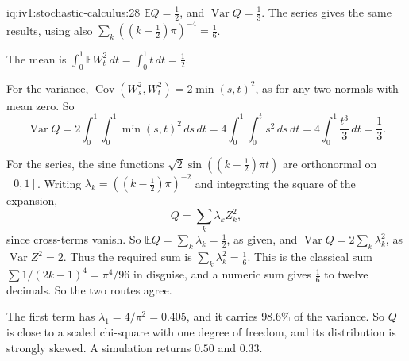 \begin{solution}{iq:iv1:stochastic-calculus:28}
$\mathbb{E}Q = \frac12$, and $\operatorname{Var}Q = \frac13$. The series gives the same results, using also $\sum_k((k - \frac12)\pi)^{-4} = \frac16$.

The mean is $\int_0^1\mathbb{E}W_t^2\,dt = \int_0^1t\,dt = \frac12$.

For the variance, $\operatorname{Cov}(W_s^2, W_t^2) = 2\min(s, t)^2$, as for any two normals with mean zero. So
\[
\operatorname{Var}Q = 2\int_0^1\int_0^1\min(s, t)^2\,ds\,dt = 4\int_0^1\int_0^ts^2\,ds\,dt = 4\int_0^1\frac{t^3}{3}\,dt = \frac13.
\]

For the series, the sine functions $\sqrt{2}\sin((k - \frac12)\pi t)$ are orthonormal on $[0, 1]$. Writing $\lambda_k = ((k - \frac12)\pi)^{-2}$ and integrating the square of the expansion,
\[
Q = \sum_k\lambda_kZ_k^2,
\]
since cross-terms vanish. So $\mathbb{E}Q = \sum_k\lambda_k = \frac12$, as given, and $\operatorname{Var}Q = 2\sum_k\lambda_k^2$, as $\operatorname{Var}Z^2 = 2$. Thus the required sum is $\sum_k\lambda_k^2 = \frac16$. This is the classical sum $\sum 1/(2k - 1)^4 = \pi^4/96$ in disguise, and a numeric sum gives $\frac16$ to twelve decimals. So the two routes agree.

The first term has $\lambda_1 = 4/\pi^2 = 0.405$, and it carries $98.6\%$ of the variance. So $Q$ is close to a scaled chi-square with one degree of freedom, and its distribution is strongly skewed. A simulation returns $0.50$ and $0.33$.



\end{solution}

